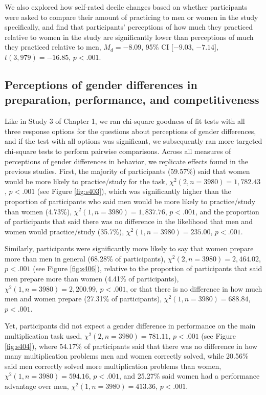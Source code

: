 \documentclass[letterpaper, nobind]{templates/ociamthesis}
\begin{document}
We also explored how self-rated decile changes based on whether participants were asked to compare their amount of practicing to men or women in the study specifically, and find that participants' perceptions of how much they practiced relative to women in the study are significantly lower than perceptions of much they practiced relative to men, \(M_d = -8.09\), 95\% CI \([-9.03\), \(-7.14]\), \(t(3,979) = -16.85\), \(p < .001\).

\hypertarget{perceptions-of-gender-differences-in-preparation-performance-and-competitiveness-5}{%
\subsection{Perceptions of gender differences in preparation, performance, and competitiveness}\label{perceptions-of-gender-differences-in-preparation-performance-and-competitiveness-5}}

Like in Study 3 of Chapter 1, we ran chi-square goodness of fit tests with all three response options for the questions about perceptions of gender differences, and if the test with all options was significant, we subsequently ran more targeted chi-square tests to perform pairwise comparisons. Across all measures of perceptions of gender differences in behavior, we replicate effects found in the previous studies. First, the majority of participants (59.57\%) said that women would be more likely to practice/study for the task, \(\chi^2(2, n = 3980) = 1,782.43\), \(p < .001\) (see Figure \ref{fig:s403}), which was significantly higher than the proportion of participants who said men would be more likely to practice/study than women (4.73\%), \(\chi^2(1, n = 3980) = 1,837.76\), \(p < .001\), and the proportion of participants that said there was no difference in the likelihood that men and women would practice/study (35.7\%), \(\chi^2(1, n = 3980) = 235.00\), \(p < .001\).

Similarly, participants were significantly more likely to say that women prepare more than men in general (68.28\% of participants), \(\chi^2(2, n = 3980) = 2,464.02\), \(p < .001\) (see Figure \ref{fig:s406}), relative to the proportion of participants that said men prepare more than women (4.41\% of participants), \(\chi^2(1, n = 3980) = 2,200.99\), \(p < .001\), or that there is no difference in how much men and women prepare (27.31\% of participants), \(\chi^2(1, n = 3980) = 688.84\), \(p < .001\).

Yet, participants did not expect a gender difference in performance on the main multiplication task used, \(\chi^2(2, n = 3980) = 781.11\), \(p < .001\) (see Figure \ref{fig:s404}), where 54.17\% of participants said that there was no difference in how many multiplication problems men and women correctly solved, while 20.56\% said men correctly solved more multiplication problems than women, \(\chi^2(1, n = 3980) = 594.16\), \(p < .001\), and 25.27\% said women had a performance advantage over men, \(\chi^2(1, n = 3980) = 413.36\), \(p < .001\).
\end{document}
